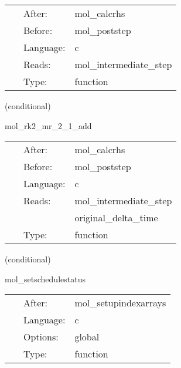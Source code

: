  \begin{tabular*}{160mm}{cll} 
~ & After:  & mol\_calcrhs \\ 
~ & Before:  & mol\_poststep \\ 
~ & Language:  & c \\ 
~ & Reads:  & mol\_intermediate\_step \\ 
~ & Type:  & function \\ 
\end{tabular*} 


\vspace{5mm}

   (conditional) 

\hspace{5mm} mol\_rk2\_mr\_2\_1\_add 

\hspace{5mm}{\it updates calculated with the multirate runge-kutta 2 method } 


\hspace{5mm}

 \begin{tabular*}{160mm}{cll} 
~ & After:  & mol\_calcrhs \\ 
~ & Before:  & mol\_poststep \\ 
~ & Language:  & c \\ 
~ & Reads:  & mol\_intermediate\_step \\ 
~& ~ &original\_delta\_time\\ 
~ & Type:  & function \\ 
\end{tabular*} 


\vspace{5mm}

   (conditional) 

\hspace{5mm} mol\_setschedulestatus 

\hspace{5mm}{\it set the flag so it is ok to register with mol } 


\hspace{5mm}

 \begin{tabular*}{160mm}{cll} 
~ & After:  & mol\_setupindexarrays \\ 
~ & Language:  & c \\ 
~ & Options:  & global \\ 
~ & Type:  & function \\ 
\end{tabular*} 


